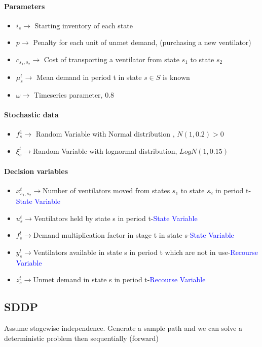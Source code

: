 \documentclass[11pt,letterpaper]{article}
\begin{document}
\paragraph{Parameters}
\begin{itemize}
   \item $i_s\rightarrow$ Starting inventory of each state 
   \item $p\rightarrow$ Penalty for each unit of unmet demand, (purchasing a new ventilator)
   \item $c_{s_1,s_2}\rightarrow$ Cost of transporting a ventilator from state $s_1$ to state $s_2$
   \item $\mu^t_s\rightarrow$ Mean demand in period t in state $s\in S$ is known
   \item $\omega \rightarrow$ Timeseries parameter, 0.8
\end{itemize}
\paragraph{Stochastic data}
\begin{itemize}
    \item $f^1_s\rightarrow$ Random Variable with Normal distribution , $N(1,0.2)> 0$
    \item $\xi^t_s\rightarrow$Random Variable with lognormal distribution, $LogN(1,0.15)$
\end{itemize}
\paragraph{Decision variables}
\begin{itemize}
    \item $x^t_{s_1,s_2}\rightarrow$Number of ventilators moved from states $s_1$ to state $s_2$ in period t-\textcolor{blue}{State Variable}
    \item $u^t_s\rightarrow$Ventilators held by state s in period t-\textcolor{blue}{State Variable}
    \item $f^t_s\rightarrow$Demand multiplication factor in stage t in state s-\textcolor{blue}{State Variable}
    \item $y^t_s\rightarrow$Ventilators available in state s in period t which are not in use-\textcolor{blue}{Recourse Variable}
    \item $z^t_s\rightarrow$Unmet demand in state s in period t-\textcolor{blue}{Recourse Variable}
\end{itemize}

\subsection{SDDP}
Assume stagewise independence.
Generate a sample path and we can solve a deterministic problem then sequentially (forward) 
\end{document}
